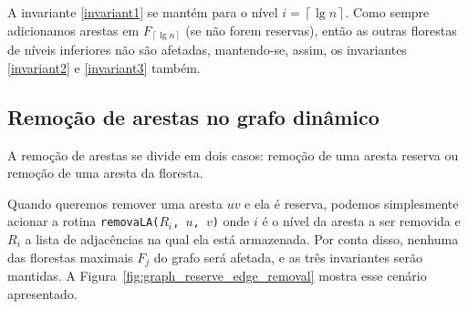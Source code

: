 A invariante \ref{invariant1} se mantém para o nível $i = \left\lceil \lg n \right\rceil$. Como sempre adicionamos arestas em $F_{\left\lceil \lg n \right\rceil}$ (se não forem reservas), então as outras florestas de níveis inferiores não são afetadas, mantendo-se, assim, os invariantes \ref{invariant2} e \ref{invariant3} também.























































\subsection{Remoção de arestas no grafo dinâmico}
\label{sec:dynamic-graph-edge-removal}

A remoção de arestas se divide em dois casos: remoção de uma aresta reserva ou remoção de uma aresta da floresta.

Quando queremos remover uma aresta $uv$ e ela é reserva, podemos simplesmente acionar a rotina \texttt{removaLA($R_i$, $u$, $v$)} onde $i$ é o nível da aresta a ser removida e $R_i$ a lista de adjacências na qual ela está armazenada. Por conta disso, nenhuma das florestas maximais $F_j$ do grafo será afetada, e as três invariantes serão mantidas. A Figura~\ref{fig:graph_reserve_edge_removal} mostra esse cenário apresentado.

